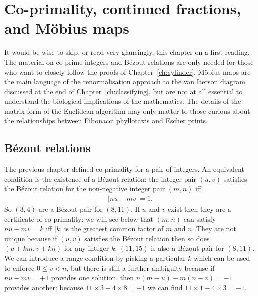 \chapter{Co-primality, continued fractions, and M\"obius maps}
It would be wise to skip, or read very glancingly, this chapter on a first reading. 
The material on co-prime integers and B\'ezout relations are only needed for those who want to closely follow the proofs of Chapter~\ref{ch:cylinder}. M\"obius maps are the main language of  the renormalisation approach to the van Iterson diagram discussed at the end of Chapter~\ref{ch:classifying}, but are not at all essential to understand the biological implications of the mathematics.  The details of the matrix form of the Euclidean algorithm may only matter to those curious about the relationships between Fibonacci phyllotaxis and Escher prints.


\section{B\'ezout relations}
The previous chapter defined co-primality for a pair of integers. An equivalent condition is the existence of a  B\'ezout relation: the integer pair $(u,v)$ satisfies the B\'ezout relation for the non-negative integer pair $(m,n)$ iff
\begin{align}
	|n  u-mv| = 1.
\end{align}
So $(3,4)$ are a B\'ezout pair for $(8,11)$. 
If $u$ and $v$ exist then they are a certificate of co-primality: we will see below that $(m,n)$ can satisfy  $ n  u - m v= k$ iff $|k|$ is the greatest common factor of $m$ and $n$. They are not unique because if $(u,v)$ satisfies the B\'ezout relation then so does $(u+km,v+kn)$ for any integer $k$: $(11,15)$ is also a B\'ezout pair for $(8,11)$. We can introduce a range condition by picking a particular $k$ which can be used to enforce $0\leq v< n$, but there is still a further ambiguity because if
$n u- m v  =+1$ provides one solution, then $n(m-u)-m(n-v)=-1$ provides another: because $11\times3-4\times8 =+1$ we can find $11\times 1-4\times 3=-1$. 

